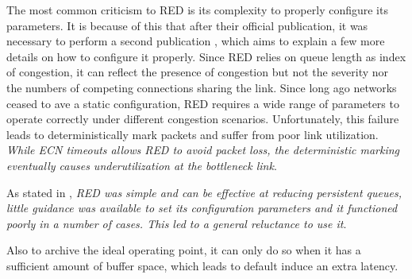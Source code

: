 The most common criticism to RED is its complexity to properly configure its
parameters. It is because of this that after their official publication, it
was necessary to perform a second publication \cite{NotesRED}, which aims to
explain a few more details on how to configure it properly. Since RED relies on
queue length as index of congestion, it can reflect the presence of congestion
but not the severity nor the numbers of competing connections sharing the
link. Since long ago networks ceased to ave a static configuration, RED requires
a wide range of parameters to operate correctly under different congestion
scenarios. Unfortunately, this failure leads to deterministically mark packets
and suffer from poor link utilization. \emph{While  ECN timeouts allows RED
to avoid packet loss, the deterministic marking eventually causes
underutilization at the bottleneck link}\cite{FengBLUEAQM}.

As stated in \cite{NicholsJacobsonCQD}, \emph{RED was simple and can be
effective at reducing persistent queues, little guidance was available to set
its configuration parameters and it functioned poorly in a number of cases.
This led to a general reluctance to use it}.

Also to archive the ideal operating point, it can only do so when it has a
sufficient amount of buffer space, which leads to default induce an extra
latency.
